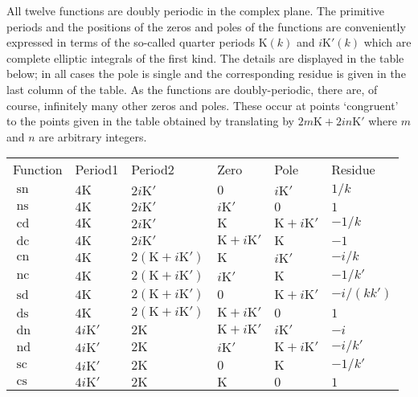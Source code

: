 All twelve functions are doubly periodic in the complex plane.
The primitive periods and the positions of the zeros and poles of the
functions are conveniently expressed in terms of the so-called quarter periods
$\mathrm{K}(k)$ and $i\mathrm{K}'(k)$ which are complete elliptic
integrals of the first kind. The details are displayed in the table below;
in all cases the pole is single and the corresponding residue is given in
the last column of the table.
As the functions are doubly-periodic, there are, of course, infinitely many
other zeros and poles. These occur at points `congruent' to the points
given in the table obtained by translating by
$2m\mathrm{K} +2i n\mathrm{K}'$ where $m$ and $n$ are arbitrary integers.

\begin{tabular}{llllll}
  Function & Period1 & Period2 & Zero & Pole & Residue\\
$\mathop{\mathrm{sn}}$&$4\mathrm{K}$&$2i\mathrm{K}'$&$0$&$i\mathrm{K}'$&$1/k$\\
$\mathop{\mathrm{ns}}$&$4\mathrm{K}$&$2i\mathrm{K}'$&$i\mathrm{K}'$&$0$&$1$\\
$\mathop{\mathrm{cd}}$&$4\mathrm{K}$&$2i\mathrm{K}'$&$\mathrm{K}$&$\mathrm{K}+i\mathrm{K}'$&$-1/k$\\
$\mathop{\mathrm{dc}}$&$4\mathrm{K}$&$2i\mathrm{K}'$&$\mathrm{K}+i\mathrm{K}'$&$\mathrm{K}$&$-1$\\

$\mathop{\mathrm{cn}}$&$4\mathrm{K}$&$2(\mathrm{K}+i\mathrm{K}')$&$\mathrm{K}$&$i\mathrm{K}'$&$-i/k$\\
$\mathop{\mathrm{nc}}$&$4\mathrm{K}$&$2(\mathrm{K}+i\mathrm{K}')$&$i\mathrm{K}'$&$\mathrm{K}$&$-1/k'$\\
$\mathop{\mathrm{sd}}$&$4\mathrm{K}$&$2(\mathrm{K}+i\mathrm{K}')$&$0$&$\mathrm{K}+i\mathrm{K}'$&$-i/(k k')$\\
$\mathop{\mathrm{ds}}$&$4\mathrm{K}$&$2(\mathrm{K}+i\mathrm{K}')$&$\mathrm{K}+i\mathrm{K}'$&$0$&$1$\\

$\mathop{\mathrm{dn}}$&$4i\mathrm{K}'$&$2\mathrm{K}$&$\mathrm{K}+i\mathrm{K}'$&$i\mathrm{K}'$&$-i$\\
$\mathop{\mathrm{nd}}$&$4i\mathrm{K}'$&$2\mathrm{K}$&$i\mathrm{K}'$&$\mathrm{K}+i\mathrm{K}'$&$-i/k'$\\
$\mathop{\mathrm{sc}}$&$4i\mathrm{K}'$&$2\mathrm{K}$&$0$&$\mathrm{K}$&$-1/k'$\\
$\mathop{\mathrm{cs}}$&$4i\mathrm{K}'$&$2\mathrm{K}$&$\mathrm{K}$&$0$&$1$\\
\end{tabular}

